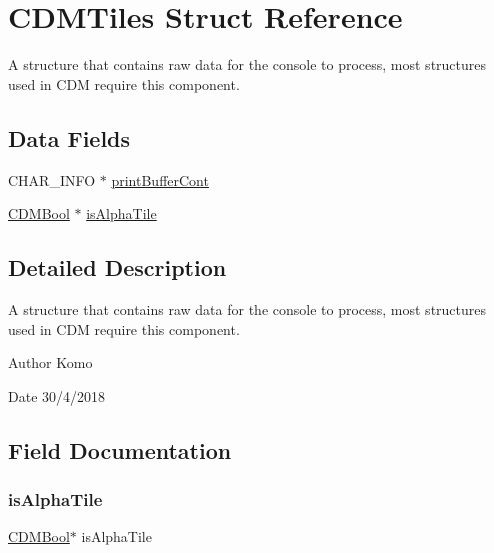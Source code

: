 \hypertarget{struct_c_d_m_tiles}{}\section{C\+D\+M\+Tiles Struct Reference}
\label{struct_c_d_m_tiles}


A structure that contains raw data for the console to process, most structures used in C\+DM require this component.  


\subsection*{Data Fields}
\begin{DoxyCompactItemize}
\item 
C\+H\+A\+R\+\_\+\+I\+N\+FO $\ast$ \mbox{\hyperlink{struct_c_d_m_tiles_a56fbdbebe0049831b3ade698fabb9ab2}{print\+Buffer\+Cont}}
\item 
\mbox{\hyperlink{_c_d_m_8h_af5296d3141c193195e69417d1825228b}{C\+D\+M\+Bool}} $\ast$ \mbox{\hyperlink{struct_c_d_m_tiles_a462bed3f7fab03fa6f131587431a6ee2}{is\+Alpha\+Tile}}
\end{DoxyCompactItemize}


\subsection{Detailed Description}
A structure that contains raw data for the console to process, most structures used in C\+DM require this component. 

\begin{DoxyAuthor}{Author}
Komo 
\end{DoxyAuthor}
\begin{DoxyDate}{Date}
30/4/2018 
\end{DoxyDate}


\subsection{Field Documentation}
\mbox{\label{struct_c_d_m_tiles_a462bed3f7fab03fa6f131587431a6ee2}} 
\subsubsection{\texorpdfstring{is\+Alpha\+Tile}{isAlphaTile}}
{\footnotesize\ttfamily \mbox{\hyperlink{_c_d_m_8h_af5296d3141c193195e69417d1825228b}{C\+D\+M\+Bool}}$\ast$ is\+Alpha\+Tile}

